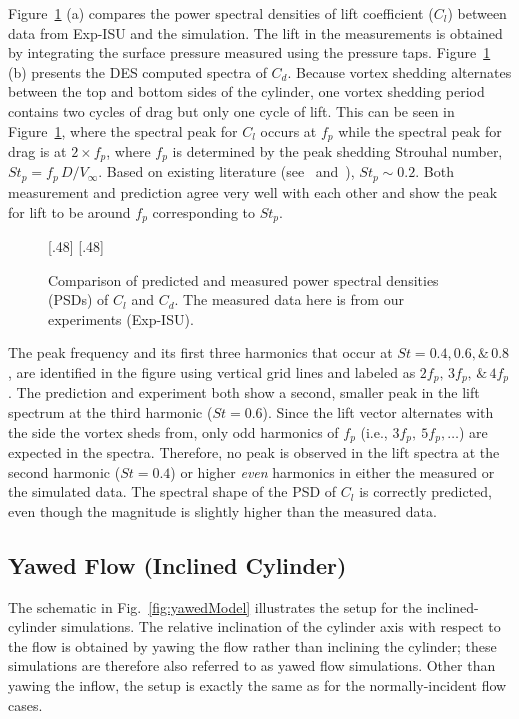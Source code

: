 Figure~\ref{fig:St_Compared_Re20k} (a) compares the power spectral densities of
lift coefficient ($C_l$) between data from Exp-ISU and the simulation. 
The lift in the measurements is obtained by integrating the surface
pressure measured using the pressure taps. Figure~\ref{fig:St_Compared_Re20k} (b)
presents the DES computed spectra of $C_d$. Because vortex shedding alternates
between the top and bottom sides of the cylinder, one vortex shedding period contains two cycles
of drag but only one cycle of lift. This can be seen in
Figure~\ref{fig:St_Compared_Re20k}, where the spectral peak for $C_l$ occurs at
$f_p$ while the spectral peak for drag is at $2\times f_p$, where $f_p$ is determined
by the peak shedding Strouhal number, $St_p = f_p\,D/V_\infty$. Based on existing
literature (see~\cite{travin2000detached} and~\cite{norberg2013pressure}),
$St_p \sim 0.2$. Both measurement and prediction agree very well with each
other and show the peak for lift to be around $f_p$ corresponding to $St_p$.
%
\begin{figure}[htb!]
  \centering
    [.48\linewidth]{}
  \hspace*{\fill}
    [.48\linewidth]{}
    \caption{Comparison of predicted and measured power spectral densities
      (PSDs) of $C_l$ and $C_d$. The
      measured data here is from our experiments (Exp-ISU).}
\label{fig:St_Compared_Re20k}
\end{figure}

The peak frequency and its first three harmonics that occur at $St = 0.4, 0.6,
\& \,0.8$, are identified in the figure using vertical grid lines and labeled
as $2f_p,\,3f_p,\,\&\,4f_p$. The prediction and experiment both show a second,
smaller peak in the lift spectrum at the third harmonic ($St=0.6$).  Since the
lift vector alternates with the side the vortex sheds from, only odd harmonics
of $f_p$ (i.e., $3f_p,~5f_p,\ldots$) are expected in the spectra. Therefore, no
peak is observed in the lift spectra at the second harmonic ($St=0.4$) or
higher {\em even} harmonics in either the measured or the simulated data. The
spectral shape of the PSD of $C_l$ is correctly predicted, even though the
magnitude is slightly higher than the measured data.


\subsection{Yawed Flow (Inclined Cylinder)}
\label{sec:inclined_cylinder}
%
The schematic in Fig.~\ref{fig:yawedModel} illustrates the setup for the
inclined-cylinder simulations. The relative inclination of the cylinder axis
with respect to the flow is obtained by yawing the flow rather than inclining
the cylinder; these simulations are therefore also referred to as yawed flow
simulations. Other than yawing the inflow, the setup is exactly the same as for
the normally-incident flow cases.

